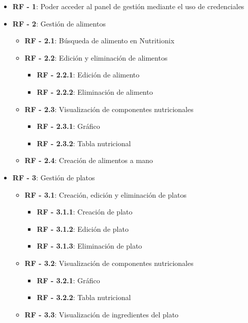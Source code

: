 \begin{itemize}
	\item \textbf{RF - 1}: Poder acceder al panel de gestión mediante el uso de credenciales
	\item \textbf{RF - 2}: Gestión de alimentos
	\begin{itemize}
		\item \textbf{RF - 2.1}: Búsqueda de alimento en Nutritionix
		\item \textbf{RF - 2.2}: Edición y eliminación de alimentos
		\begin{itemize}
			\item \textbf{RF - 2.2.1}: Edición de alimento
			\item \textbf{RF - 2.2.2}: Eliminación de alimento
		\end{itemize}
		\item \textbf{RF - 2.3}: Visualización de componentes nutricionales
		\begin{itemize}
			\item \textbf{RF - 2.3.1}: Gráfico
			\item \textbf{RF - 2.3.2}: Tabla nutricional
		\end{itemize}
		\item \textbf{RF - 2.4}: Creación de alimentos a mano 
	\end{itemize}
	
	\item \textbf{RF - 3}: Gestión de platos
	\begin{itemize}
		\item \textbf{RF - 3.1}: Creación, edición y eliminación de platos
		\begin{itemize}
			\item \textbf{RF - 3.1.1}: Creación de plato
			\item \textbf{RF - 3.1.2}: Edición de plato
			\item \textbf{RF - 3.1.3}: Eliminación de plato
		\end{itemize}
		\item \textbf{RF - 3.2}: Visualización de componentes nutricionales
		\begin{itemize}
			\item \textbf{RF - 3.2.1}: Gráfico
			\item \textbf{RF - 3.2.2}: Tabla nutricional
		\end{itemize}
		\item \textbf{RF - 3.3}: Visualización de ingredientes del plato 
	\end{itemize}
	

\end{itemize}
